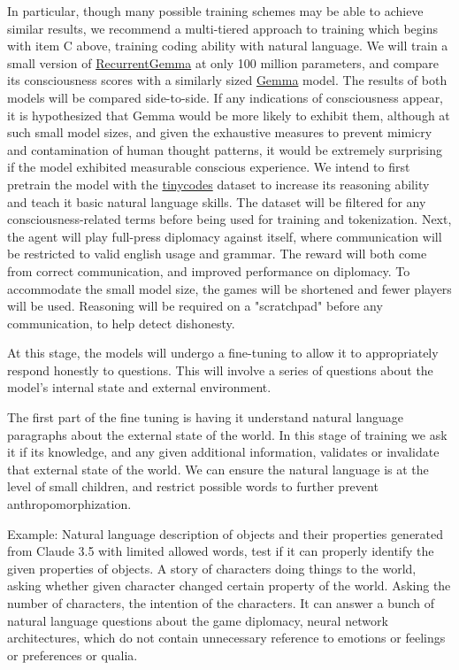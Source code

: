 \documentclass{article}
\begin{document}
In particular, though many possible training schemes may be able to achieve similar results, we recommend a multi-tiered approach to training which begins with item C above, training coding ability with natural language.
We will train a small version of \href{https://github.com/google-deepmind/recurrentgemma}{RecurrentGemma} at only 100 million parameters, and compare its consciousness scores with a similarly sized \href{https://github.com/google/gemma_pytorch}{Gemma} model. The results of both models will be compared side-to-side. If any indications of consciousness appear, it is hypothesized that Gemma would be more likely to exhibit them, although at such small model sizes, and given the exhaustive measures to prevent mimicry and contamination of human thought patterns, it would be extremely surprising if the model exhibited measurable conscious experience.
We intend to first pretrain the model with the \href{https://huggingface.co/datasets/nampdn-ai/tiny-codes}{tinycodes} dataset to increase its reasoning ability and teach it basic natural language skills. The dataset will be filtered for any consciousness-related terms before being used for training and tokenization. Next, the agent will play full-press diplomacy against itself, where communication will be restricted to valid english usage and grammar. The reward will both come from correct communication, and improved performance on diplomacy. To accommodate the small model size, the games will be shortened and fewer players will be used. Reasoning will be required on a "scratchpad" before any communication, to help detect dishonesty.

At this stage, the models will undergo a fine-tuning to allow it to appropriately respond honestly to questions. This will involve a series of questions about the model's internal state and external environment.

The first part of the fine tuning is having it understand natural language paragraphs about the external state of the world. In this stage of training we ask it if its knowledge, and any given additional information, validates or invalidate that external state of the world. We can ensure the natural language is at the level of small children, and restrict possible words to further prevent anthropomorphization.

Example: Natural language description of objects and their properties generated from Claude 3.5 with limited allowed words, test if it can properly identify the given properties of objects. A story of characters doing things to the world, asking whether given character changed certain property of the world. Asking the number of characters, the intention of the characters. It can answer a bunch of natural language questions about the game diplomacy, neural network architectures, which do not contain unnecessary reference to emotions or feelings or preferences or qualia.
\end{document}
